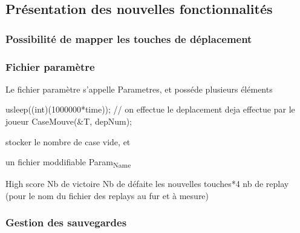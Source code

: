 \documentclass[letter]{article}
\begin{document}
\subsection{Présentation des nouvelles fonctionnalités}
\label{sec:orgdb3a22f}


\subsubsection{Possibilité de mapper les touches de déplacement}
\label{sec:org49421fe}

\subsubsection{Fichier paramètre}
\label{sec:org02b90ca}

Le fichier paramètre s'appelle Parametres, et posséde plusieurs éléments



usleep((int)(1000000*time));
// on effectue le deplacement deja effectue par le joueur
CaseMouve(\&T, depNum);

stocker le nombre de case vide, et


un fichier moddifiable
Param\textsubscript{Name}

High score
Nb de victoire
Nb de défaite
les nouvelles touches*4
nb de replay (pour le nom du fichier des replays au fur et à mesure)


\subsubsection{Gestion des sauvegardes}
\label{sec:org5920778}
\end{document}
